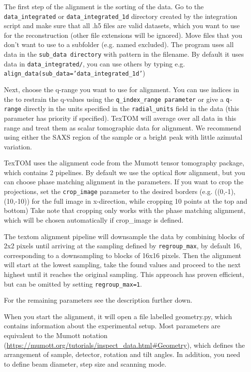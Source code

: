 The first step of the alignment is the sorting of the data. 
Go to the \texttt{data\_integrated} or \texttt{data\_integrated\_1d} directory created by the integration script
and make sure that all .h5 files are valid datasets, which you 
want to use for the reconstruction (other file extensions will be ignored). 
Move files that you don't want to use to a subfolder (e.g. named excluded).
The program uses all data in the \texttt{sub\_data directory} with pattern in the filename.
By default it uses data in \texttt{data\_integrated/}, you can use others by typing e.g. \texttt{align\_data(sub\_data='data\_integrated\_1d'})

Next, choose the q-range you want to use for alignment. You can use indices in the to restrain the q-values
using the \texttt{q\_index\_range parameter} or give a \texttt{q-range} directly in the units specified in the \texttt{radial\_units}
field in the data (this parameter has priority if specified). TexTOM will average over all data in this range 
and treat them as scalar tomographic data for alignment. We recommend using either the SAXS region of 
the sample or a bright peak with little azimutal variation.

TexTOM uses the alignment code from the Mumott tensor tomography package, which contains 2 pipelines.
By default we use the optical flow alignment, but you can choose phase matching alignment in the parameters.
If you want to crop the projections, set the \texttt{crop\_image} parameter to the desired borders (e.g. ((0,-1),(10,-10))
for the full image in x-direction, while cropping 10 points at the top and bottom)
Take note that cropping only works with the phase matching alignment, which will be chosen automatically if 
crop\_image is defined.

The textom alignment pipeline will downsample the data by combining blocks of 2x2 pixels until arriving at the 
sampling defined by \texttt{regroup\_max}, by default 16, corresponding to a downsampling to blocks of 16x16 pixels.
Then the alignment will start at the lowest sampling, take the found values and proceed to the next highest until it reaches the
original sampling. This approach has proven efficient, but can be omitted by setting \texttt{regroup\_max=1}.

For the remaining parameters see the description further down.

When you start the alignment, it will open a file labelled geometry.py, which contains information about the
experimental setup. Most parameters are equivalent to the Mumott notation (\url{https://mumott.org/tutorials/inspect_data.html#Geometry}),
which defines the arrangement of sample, detector, rotation and tilt angles.
In addition, you need to define beam diameter, step size and scanning mode.

